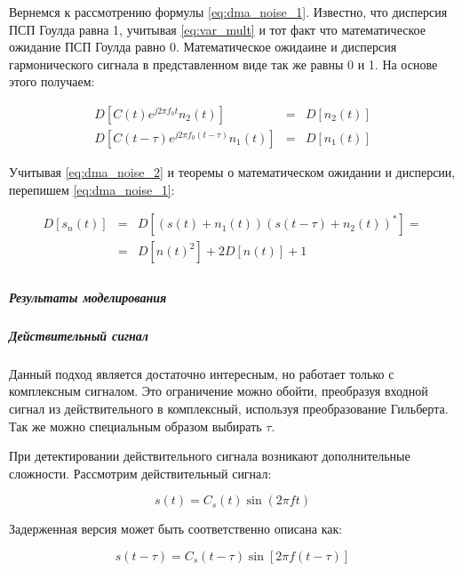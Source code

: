 Вернемся к рассмотрению формулы \ref{eq:dma_noise_1}. Известно, что дисперсия ПСП Гоулда равна 1, учитывая \ref{eq:var_mult}
и тот факт что математическое ожидание ПСП Гоулда равно 0. Математическое ожидаине и дисперсия гармонического сигнала в
представленном виде так же равны 0 и 1. На основе этого получаем:
\begin{center}
\begin{eqnarray}
	\label{eq:dma_noise_2}
	D[C(t)e^{j2{\pi}f_{0}t}n_{2}(t)] & = & D[n_{2}(t)] \nonumber \\
	D[C(t-\tau)e^{j2{\pi}f_{0}(t-\tau)}n_{1}(t)] & = & D[n_{1}(t)]
\end{eqnarray}
\end{center}

Учитывая \ref{eq:dma_noise_2} и теоремы о математическом ожидании и дисперсии, перепишем \ref{eq:dma_noise_1}:
\begin{center}
\begin{eqnarray}
	D[s_{n}(t)] & = & D[(s(t)+n_{1}(t))(s(t-\tau)+n_{2}(t))^{*}]=\nonumber \\
	& = & D[n(t)^{2}] + 2D[n(t)] + 1 \label{eq:dma_noise_3} \\
\end{eqnarray}
\end{center}

\subparagraph{Результаты моделирования}
\label{sssec:dma_simulate}

\subparagraph{Действительный сигнал}
\label{sec1:dma_real}

Данный подход является достаточно интересным, но работает только с комплексным сигналом. Это ограничение можно
обойти, преобразуя входной сигнал из действительного в комплексный, используя преобразование Гильберта.
Так же можно специальным образом выбирать ${\tau}$.

При детектировании действительного сигнала возникают дополнительные сложности. Рассмотрим действительный сигнал:
\begin{center}
\begin{equation}
	\label{eq:dma_real1}
	s(t) = C_s(t) \sin{(2\pi ft)}
\end{equation}
\end{center}

Задерженная версия может быть соответственно описана как:
\begin{center}
\begin{equation}
	\label{eq:dma_real2}
	s(t - \tau) = C_s(t-\tau) \sin{\left[2\pi f(t-\tau)\right]}
\end{equation}
\end{center}

